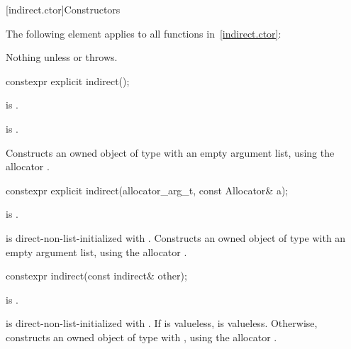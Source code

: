 

[indirect.ctor]{Constructors}

\pnum
The following element applies to all functions in~\ref{indirect.ctor}:

\begin{itemdescr}
\pnum
\throws
Nothing unless  or
 throws.
\end{itemdescr}

%
\begin{itemdecl}
constexpr explicit indirect();
\end{itemdecl}

\begin{itemdescr}
\pnum
\constraints
{} is .

\pnum
\mandates
{} is .

\pnum
\effects
Constructs an owned object of type  with an empty argument list,
using the allocator .
\end{itemdescr}

%
\begin{itemdecl}
constexpr explicit indirect(allocator_arg_t, const Allocator& a);
\end{itemdecl}

\begin{itemdescr}
\pnum
\mandates
{} is .

\pnum
\effects
{} is direct-non-list-initialized with .
Constructs an owned object of type  with an empty argument list,
using the allocator .
\end{itemdescr}

%
\begin{itemdecl}
constexpr indirect(const indirect& other);
\end{itemdecl}

\begin{itemdescr}
\pnum
\mandates
{} is .

\pnum
\effects
{} is direct-non-list-initialized with
.
If  is valueless,  is valueless.
Otherwise,
constructs an owned object of type  with ,
using the allocator .
\end{itemdescr}

